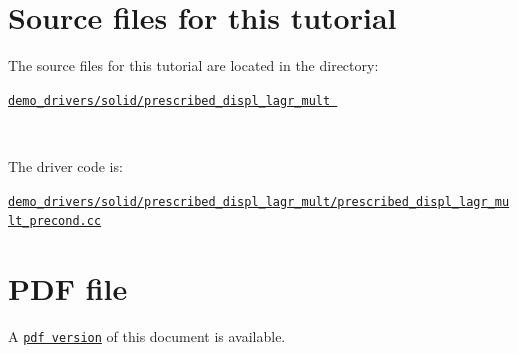  

\hypertarget{index_sources}{}\section{Source files for this tutorial}\label{index_sources}

\begin{DoxyItemize}
\item The source files for this tutorial are located in the directory\+:~\newline
~\newline
\begin{center} \href{../../../../demo_drivers/solid/prescribed_displ_lagr_mult}{\tt demo\+\_\+drivers/solid/prescribed\+\_\+displ\+\_\+lagr\+\_\+mult } \end{center} ~\newline

\item The driver code is\+: ~\newline
~\newline
\begin{center} \href{../../../../demo_drivers/solid/prescribed_displ_lagr_mult/prescribed_displ_lagr_mult_precond.cc}{\tt demo\+\_\+drivers/solid/prescribed\+\_\+displ\+\_\+lagr\+\_\+mult/prescribed\+\_\+displ\+\_\+lagr\+\_\+mult\+\_\+precond.\+cc} \end{center} 
\end{DoxyItemize}



 

 \hypertarget{index_pdf}{}\section{P\+D\+F file}\label{index_pdf}
A \href{../latex/refman.pdf}{\tt pdf version} of this document is available. 
